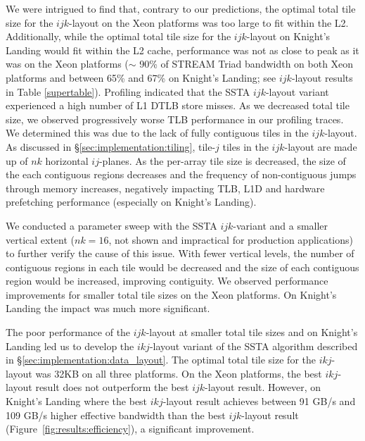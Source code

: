 \documentclass{sig-alternate-05-2015}
\begin{document}
We were intrigued to find that, contrary to our predictions, the optimal total
  tile size for the \(ijk\)-layout on the Xeon platforms was too large to fit
  within the L2.
Additionally, while the optimal total tile size for the \(ijk\)-layout on
  Knight's Landing would fit within the L2 cache, performance was not as close to
  peak as it was on the Xeon platforms (\(\sim\) 90\% of STREAM Triad bandwidth
  on both Xeon platforms and between 65\% and 67\% on Knight's Landing; see
  \(ijk\)-layout results in Table \ref{supertable}).
Profiling indicated that the SSTA \(ijk\)-layout variant experienced a high
  number of L1 DTLB store misses.
As we decreased total tile size, we observed progressively worse TLB performance
  in our profiling traces.
We determined this was due to the lack of fully contiguous tiles in the
  \(ijk\)-layout. 
As discussed in \S\ref{sec:implementation:tiling}, tile-\(j\) tiles in the
  \(ijk\)-layout are made up of \(nk\) horizontal \(ij\)-planes. 
As the per-array tile size is decreased, the size of the each contiguous
  regions decreases and the frequency of non-contiguous jumps through memory
  increases, negatively impacting TLB, L1D and hardware prefetching performance
  (especially on Knight's Landing).

We conducted a parameter sweep with the SSTA \(ijk\)-variant and a smaller
  vertical extent (\(nk = 16\), not shown and impractical for production
  applications) to further verify the cause of this issue.
With fewer vertical levels, the number of contiguous regions in each tile would
  be decreased and the size of each contiguous region would be increased, improving
  contiguity.
We observed performance improvements for smaller total tile sizes on the Xeon
  platforms.
On Knight's Landing the impact was much more significant.

The poor performance of the \(ijk\)-layout at smaller total tile sizes and on
  Knight's Landing led us to develop the \(ikj\)-layout variant of the SSTA
  algorithm described in \S\ref{sec:implementation:data_layout}.
The optimal total tile size for the \(ikj\)-layout was 32KB on all three
  platforms.
On the Xeon platforms, the best \(ikj\)-layout result does not
  outperform the best \(ijk\)-layout result.
However, on Knight's Landing where the best \(ikj\)-layout result achieves
  between 91 GB/s and 109 GB/s higher effective bandwidth than the best
  \(ijk\)-layout result (Figure~\ref{fig:results:efficiency}), a significant
  improvement.
\end{document}

